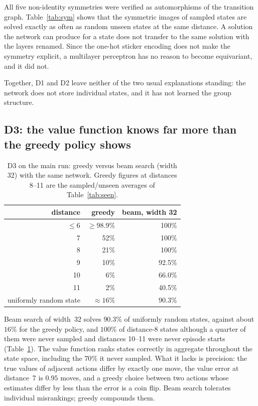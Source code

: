 \documentclass[11pt]{article}
\begin{document}
All five non-identity symmetries were verified as automorphisms of the transition graph.
Table~\ref{tab:sym} shows that the symmetric images of sampled states are solved exactly as
often as random unseen states at the same distance. A solution the network can produce for a
state does not transfer to the same solution with the layers renamed. Since the one-hot sticker
encoding does not make the symmetry explicit, a multilayer perceptron has no reason to become
equivariant, and it did not.

Together, D1 and D2 leave neither of the two usual explanations standing: the network does not
store individual states, and it has not learned the group structure.

\subsection{D3: the value function knows far more than the greedy policy shows}

\begin{table}[t]
\centering\small
\caption{D3 on the main run: greedy versus beam search (width 32) with the same network.
Greedy figures at distances 8--11 are the sampled/unseen averages of Table~\ref{tab:seen}.}
\label{tab:beam}
\begin{tabular}{rrr}
\toprule
distance & greedy & beam, width 32 \\
\midrule
$\le6$ & $\ge 98.9\%$ & 100\% \\
7  & 52\%  & 100\% \\
8  & 21\%  & 100\% \\
9  & 10\%  & 92.5\% \\
10 & 6\%   & 66.0\% \\
11 & 2\%   & 40.5\% \\
\midrule
uniformly random state & $\approx16\%$ & 90.3\% \\
\bottomrule
\end{tabular}
\end{table}

Beam search of width~32 solves $90.3\%$ of uniformly random states, against about $16\%$ for
the greedy policy, and $100\%$ of distance-8 states although a quarter of them were never
sampled and distances 10--11 were never episode starts (Table~\ref{tab:beam}). The value
function ranks states correctly in aggregate throughout the state space, including the $70\%$ it
never sampled. What it lacks is precision: the true values of adjacent actions differ by
exactly one move, the value error at distance~7 is $0.95$ moves, and a greedy choice between
two actions whose estimates differ by less than the error is a coin flip. Beam search tolerates
individual misrankings; greedy compounds them.
\end{document}
